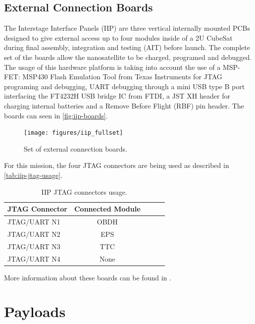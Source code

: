 \subsection{External Connection Boards}

The Interstage Interface Panels (IIP) are three vertical internally mounted PCBs designed to give external access up to four modules inside of a 2U CubeSat during final assembly, integration and testing (AIT) before launch. The complete set of the boards allow the nanosatellite to be charged, programed and debugged. The usage of this hardware platform is taking into account the use of a MSP-FET: MSP430 Flash Emulation Tool from Texas Instruments for JTAG programing and debugging, UART debugging through a mini USB type B port interfacing the FT4232H USB bridge IC from FTDI, a JST XH header for charging internal batteries and a Remove Before Flight (RBF) pin header. The boards can seen in \autoref{fig:iip-boards}.

\begin{figure}[!ht]
    \begin{center}
        \texttt{[image: figures/iip\_fullset]}
        \caption{Set of external connection boards.}
        \label{fig:iip-boards}
    \end{center}
\end{figure}

For this mission, the four JTAG connectors are being used as described in \autoref{tab:iip-jtag-usage}.

\begin{table}[!h]
    \centering
    \begin{tabular}{lcccc}
        \toprule[1.5pt]
        \textbf{JTAG Connector} & \textbf{Connected Module} \\
        \midrule
        JTAG/UART N1 & OBDH \\
        JTAG/UART N2 & EPS \\
        JTAG/UART N3 & TTC \\
        JTAG/UART N4 & None \\
        \bottomrule[1.5pt]
    \end{tabular}
    \caption{IIP JTAG connectors usage.}
    \label{tab:iip-jtag-usage}
\end{table}

More information about these boards can be found in \cite{iip}.

\section{Payloads}

